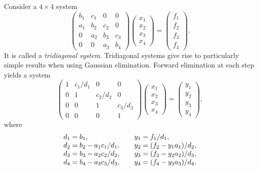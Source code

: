 \noindent Consider a $4\times 4$ system 
%
\begin{equation*}
  \left ( \begin{array}{cccc}
      b_1 & c_1 & 0 & 0\\ a_1 & b_2 & c_2 & 0 \\
      0 & a_2 & b_3 & c_3 \\ 0 & 0 & a_3 & b_4 
    \end{array} \right ) 
  \begin{pmatrix}
    x_1 \\ x_2 \\ x_3 \\ x_4
  \end{pmatrix}
  =
  \begin{pmatrix}
    f_1 \\ f_2\\ f_3 \\ f_4
  \end{pmatrix}.
\end{equation*}
%
It is called a \textit{tridiagonal system}. Tridiagonal systems give
rise to particularly simple results when using Gaussian elimination.
Forward elimination at each step yields a system 
%
\begin{equation*}
  \left ( \begin{array}{cccc} 
      1 & c_1/d_1 & 0 & 0 \\ 0 & 1 & c_2/d_2 & 0 \\ 
      0 & 0 & 1 & c_3/d_3 \\ 0 & 0 & 0 & 1 
    \end{array} \right ) 
  \begin{pmatrix}
    x_1 \\ x_2 \\ x_3 \\ x_4
  \end{pmatrix}
  =
  \begin{pmatrix}
    y_1 \\ y_2\\ y_3 \\ y_4
  \end{pmatrix},
\end{equation*}
%
where 
%
\begin{equation*}
  \begin{array}{ll@{\hspace{4mm}}l}
    d_1=b_1, & & y_1=f_1/d_1, \\
    d_2=b_2-a_1c_1/d_1, & & y_2=(f_2-y_1 a_1)/d_2, \\
    d_3=b_3-a_2c_2/d_2, & & y_3=(f_3-y_2 a_2)/d_3, \\
    d_4=b_4-a_3c_3/d_3, & & y_4=(f_4-y_3 a_3)/d_4.
  \end{array}
\end{equation*}
